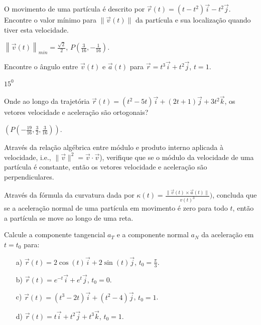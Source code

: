 \begin{exer}
O movimento de uma partícula é descrito por $\vec{r}(t)=(t-t^2)\vec{i}-t^2\vec{j}$. Encontre o valor mínimo  para $\|\vec{v}(t)\|$ da partícula e sua localização quando tiver esta velocidade. 
\end{exer}
\begin{resp}
 $\left\|\vec{v}(t)\right\|_{min}=\frac{\sqrt{2}}{2}$, $P\left(\frac{3}{16},-\frac{1}{16}\right)$.
 \end{resp}
\begin{exer}
 Encontre o ângulo entre $\vec{v}(t)$ e $\vec{a}(t)$ para $\vec{r}=t^3\vec{i}+t^2\vec{j}$, $t=1$.
\end{exer}
\begin{resp}
 $15^0$
\end{resp}
\begin{exer}
 Onde ao longo da trajetória $\vec{r}(t)=(t^2-5t)\vec{i}+(2t+1)\vec{j}+3t^2\vec{k}$, os vetores velocidade e aceleração são ortogonais?
\end{exer}
\begin{resp}
 $\left(P\left(-\frac{19}{16},\frac{3}{2},\frac{3}{16}\right)\right)$.
\end{resp}
\begin{exer} Através da relação algébrica entre módulo e produto interno aplicada à velocidade, i.e., $\|\vec{v}\|^2=\vec{v}\cdot\vec{v}$), verifique  que se o módulo da velocidade de uma partícula é constante, então os vetores velocidade e aceleração são perpendiculares. 
\end{exer}
\begin{exer} Através da fórmula da curvatura dada por $\kappa(t)=\frac{\|\vec{v}(t)\times \vec{a}(t)\|}{v(t)^3} )$, concluda que se a aceleração normal de uma partícula em movimento é zero para todo $t$, então a partícula se move ao longo de uma reta. 
\end{exer}
\begin{exer} Calcule a componente tangencial $a_T$ e a componente normal $a_N$ da aceleração em $t=t_0$ para:
\begin{itemize}
 \item[a)] $\vec{r}(t)=2\cos(t)\vec{i}+2\sin(t)\vec{j}$, $t_0=\frac{\pi}{3}$.
 \item[b)] $\vec{r}(t)=e^{-t}\vec{i}+e^{t}\vec{j}$, $t_0=0$.
 \item[c)] $\vec{r}(t)=(t^3-2t)\vec{i}+(t^2-4)\vec{j}$, $t_0=1$.
 \item[d)] $\vec{r}(t)=t\vec{i}+t^2\vec{j}+t^3\vec{k}$, $t_0=1$.
\end{itemize}
\end{exer}
